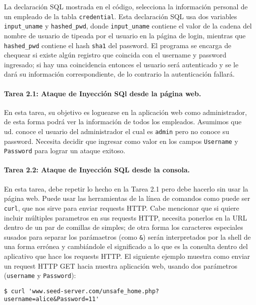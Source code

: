 La declaración SQL mostrada en el código, selecciona la información personal de un empleado  de la tabla {\tt credential}. Esta declaración SQL usa dos variables \texttt{input\_uname} y \texttt{hashed\_pwd}, donde \texttt{input\_uname} contiene el valor de la cadena del nombre de usuario de tipeada por el usuario en la página de login, mientras que \texttt{hashed\_pwd} contiene el hash \texttt{sha1} del password. El programa se encarga de chequear si existe algún registro que coincida con el username y password ingresado; si hay una coincidencia entonces el usuario será autenticado y se le dará su información correspondiente, de lo contrario la autenticación fallará.


\paragraph{Tarea 2.1: Ataque de Inyección SQl desde la página web.}
En esta tarea, su objetivo es loguearse en la aplicación web como administrador, de esta forma podrá ver la información de todos los empleados. Asumimos que ud. conoce el usuario del administrador el cual es {\tt admin} pero no conoce su password. Necesita decidir que ingresar como valor en los campos \texttt{Username} y \texttt{Password} para lograr un ataque exitoso.
	

\paragraph{Tarea 2.2: Ataque de Inyección SQL desde la consola.}  
En esta tarea, debe repetir lo hecho en la Tarea 2.1 pero debe hacerlo sin usar la página web. Puede usar las herramientas de la línea de comandos como puede ser \texttt{curl}, que nos sirve para enviar requests HTTP.
Cabe mencionar que si quiere incluir múltiples parametros en sus requests HTTP, necesita ponerlos en la URL dentro de un par de comillas de simples; de otra forma los caracteres especiales susados para separar los parámaetros (como \texttt{\&}) serán interpretados por la shell de una forma errónea y cambiándole el significado a lo que es la consulta dentro del aplicativo que hace los requests HTTP. El siguiente ejemplo muestra como enviar un request HTTP GET hacia nuestra aplicación web, usando dos parámetros (\texttt{username} y \texttt{Password}):

\begin{lstlisting}
$ curl 'www.seed-server.com/unsafe_home.php?username=alice&Password=11'
\end{lstlisting}

